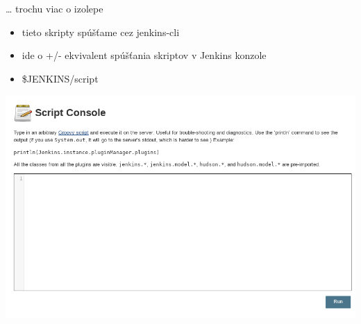\documentclass[bigger]{beamer}
\begin{document}
\begin{frame}[label={sec:org79e4fff}]{\ldots{} trochu viac o izolepe}
\begin{itemize}
\item tieto skripty spúšťame cez jenkins-cli
\item ide o +/- ekvivalent spúšťania skriptov v Jenkins konzole
\item \$JENKINS/script
\end{itemize}
\begin{center}
\includegraphics[width=.9\linewidth]{./025script.png}
\end{center}
\end{frame}
\end{document}
